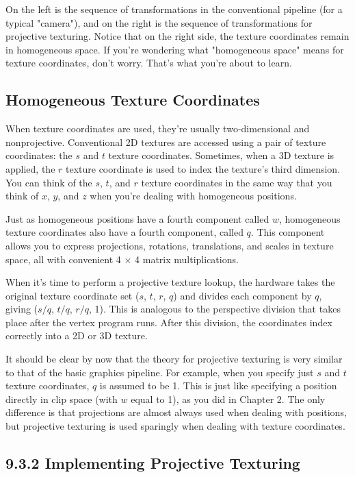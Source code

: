 \documentclass[../main.tex]{subfiles}
\begin{document}
On the left is the sequence of transformations in the conventional pipeline (for a typical "camera"), and on the right is the sequence of transformations for projective texturing. Notice that on the right side, the texture coordinates remain in homogeneous space. If you're wondering what "homogeneous space" means for texture coordinates, don't worry. That's what you're about to learn.

\subsection*{Homogeneous Texture Coordinates}

When texture coordinates are used, they're usually two-dimensional and nonprojective. Conventional 2D textures are accessed using a pair of texture coordinates: the $s$ and $t$ texture coordinates. Sometimes, when a 3D texture is applied, the $r$ texture coordinate is used to index the texture's third dimension. You can think of the $s$, $t$, and $r$ texture coordinates in the same way that you think of $x$, $y$, and $z$ when you're dealing with homogeneous positions.

Just as homogeneous positions have a fourth component called $w$, homogeneous texture coordinates also have a fourth component, called $q$. This component allows you to express projections, rotations, translations, and scales in texture space, all with convenient 4 $\times$ 4 matrix multiplications.

When it's time to perform a projective texture lookup, the hardware takes the original texture coordinate set ($s$, $t$, $r$, $q$) and divides each component by $q$, giving ($s/q$, $t/q$, $r/q$, 1). This is analogous to the perspective division that takes place after the vertex program runs. After this division, the coordinates index correctly into a 2D or 3D texture.

It should be clear by now that the theory for projective texturing is very similar to that of the basic graphics pipeline. For example, when you specify just $s$ and $t$ texture coordinates, $q$ is assumed to be 1. This is just like specifying a position directly in clip space (with $w$ equal to 1), as you did in Chapter 2. The only difference is that projections are almost always used when dealing with positions, but projective texturing is used sparingly when dealing with texture coordinates.

\subsection{9.3.2 Implementing Projective Texturing}
\end{document}
